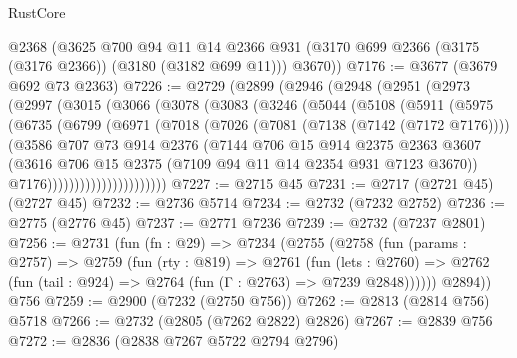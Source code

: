 \begin{lexlean}{RustCore}
\begin{coremodule}
      @2368
      (@3625
        @700
        @94
        @11
        @14
        @2366
        @931
        (@3170 @699 @2366 (@3175 (@3176 @2366)) (@3180 (@3182 @699 @11)))
        @3670))
@7176 := @3677 (@3679 @692 @73 @2363)
@7226 := @2729
    (@2899
      (@2946
        (@2948
          (@2951
            (@2973
              (@2997
                (@3015
                  (@3066
                    (@3078
                      (@3083
                        (@3246
                          (@5044
                            (@5108
                              (@5911
                                (@5975
                                  (@6735
                                    (@6799
                                      (@6971
                                        (@7018
                                          (@7026
                                            (@7081 (@7138 (@7142 (@7172 @7176))))
                                            (@3586
                                              @707
                                              @73
                                              @914
                                              @2376
                                              (@7144
                                                @706
                                                @15
                                                @914
                                                @2375
                                                @2363
                                                @3607
                                                (@3616
                                                  @706
                                                  @15
                                                  @2375
                                                  (@7109 @94 @11 @14 @2354 @931 @7123 @3670))
                                                @7176))))))))))))))))))))))
@7227 := @2715 @45
@7231 := @2717 (@2721 @45) (@2727 @45)
@7232 := @2736 @5714
@7234 := @2732 (@7232 @2752)
@7236 := @2775 (@2776 @45)
@7237 := @2771 @7236
@7239 := @2732 (@7237 @2801)
@7256 := @2731
    (fun (fn : @29) =>
    @7234
      (@2755
        (@2758
          (fun (params : @2757) =>
          @2759
            (fun (rty : @819) =>
            @2761
              (fun (lets : @2760) =>
              @2762 (fun (tail : @924) => @2764 (fun (Γ : @2763) => @7239 @2848))))))
        @2894))
    @756
@7259 := @2900 (@7232 (@2750 @756))
@7262 := @2813 (@2814 @756) @5718
@7266 := @2732 (@2805 (@7262 @2822) @2826)
@7267 := @2839 @756
@7272 := @2836 (@2838 @7267 @5722 @2794 @2796)

\end{coremodule}
\end{lexlean}
